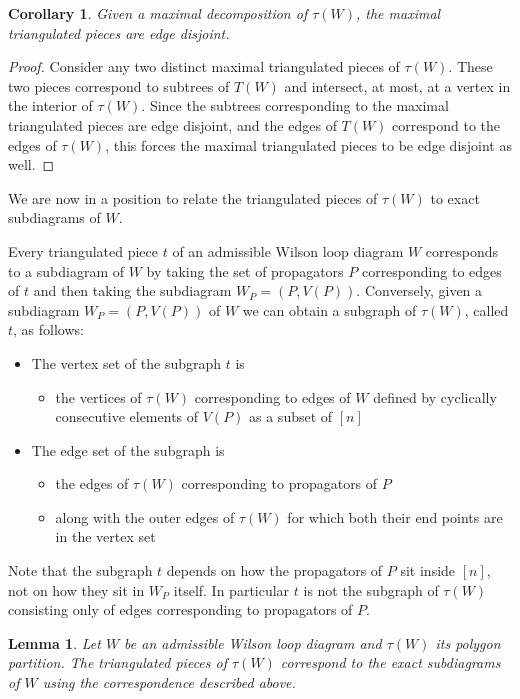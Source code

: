 \documentclass[11pt]{article}
\newtheorem{lem}[thm]{Lemma}
\newtheorem{cor}[thm]{Corollary}
\theoremstyle{remark}
\theoremstyle{definition}
\begin{document}
\begin{cor} \label{maxtriangdisjointcor}
Given a maximal decomposition of $\tau(W)$, the maximal triangulated pieces are edge disjoint.
\end{cor}

\begin{proof}
Consider any two distinct maximal triangulated pieces of $\tau(W)$. These two pieces correspond to subtrees of $T(W)$ and intersect, at most, at a vertex in the interior of $\tau(W)$. Since the subtrees corresponding to the maximal triangulated pieces are edge disjoint, and the edges of $T(W)$ correspond to the edges of $\tau(W)$, this forces the maximal triangulated pieces to be edge disjoint as well.
\end{proof}


We are now in a position to relate the triangulated pieces of $\tau(W)$ to exact subdiagrams of $W$.

Every triangulated piece $t$ of an admissible Wilson loop diagram $W$ corresponds to a subdiagram of $W$ by taking the set of propagators $P$ corresponding to edges of $t$ and then taking the subdiagram $W_P = (P, V(P))$.  Conversely, given a subdiagram $W_P = (P, V(P))$ of $W$ we can obtain a subgraph of $\tau(W)$, called $t$, as follows:
\begin{itemize}
\item The vertex set of the subgraph $t$ is
  \begin{itemize}
  \item the vertices of $\tau(W)$ corresponding to edges of $W$ defined by cyclically consecutive elements of $V(P)$ as a subset of $[n]$
  \end{itemize}
\item The edge set of the subgraph is
  \begin{itemize}
  \item the edges of $\tau(W)$ corresponding to propagators of $P$
  \item along with the outer edges of $\tau(W)$ for which both their end points are in the vertex set
  \end{itemize}
\end{itemize}
Note that the subgraph $t$ depends on how the propagators of $P$ sit inside $[n]$, not on how they sit in $W_P$ itself.  In particular $t$ is not the subgraph of $\tau(W)$ consisting only of edges corresponding to propagators of $P$. 


\begin{lem}\label{lem triang to exact}
  Let $W$ be an admissible Wilson loop diagram and $\tau(W)$ its polygon partition.  The triangulated pieces of $\tau(W)$ correspond to the exact subdiagrams of $W$ using the correspondence described above.
\end{lem}
\end{document}
